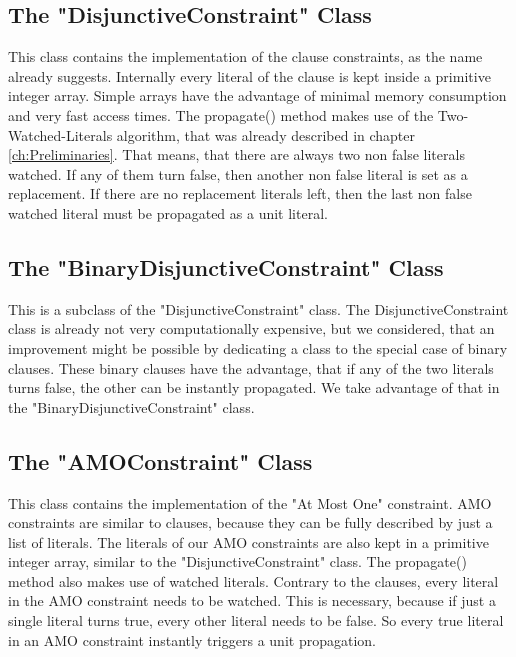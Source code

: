 \subsection{The "DisjunctiveConstraint" Class}

This class contains the implementation of the clause constraints, as the name already suggests. Internally every literal of the clause is kept inside a primitive integer array. Simple arrays have the advantage of minimal memory consumption and very fast access times. The propagate() method makes use of the Two-Watched-Literals algorithm, that was already described in chapter \ref{ch:Preliminaries}. That means, that there are always two non false literals watched. If any of them turn false, then another non false literal is set as a replacement. If there are no replacement literals left, then the last non false watched literal must be propagated as a unit literal.

\subsection{The "BinaryDisjunctiveConstraint" Class}

This is a subclass of the "DisjunctiveConstraint" class. The DisjunctiveConstraint class is already not very computationally expensive, but we considered, that an improvement might be possible by dedicating a class to the special case of binary clauses. These binary clauses have the advantage, that if any of the two literals turns false, the other can be instantly propagated. We take advantage of that in the "BinaryDisjunctiveConstraint" class.

\subsection{The "AMOConstraint" Class}

This class contains the implementation of the "At Most One" constraint. AMO constraints are similar to clauses, because they can be fully described by just a list of literals.
The literals of our AMO constraints are also kept in a primitive integer array, similar to the "DisjunctiveConstraint" class. The propagate() method also makes use of watched literals. Contrary to the clauses, every literal in the AMO constraint needs to be watched. This is necessary, because if just a single literal turns true, every other literal needs to be false. So every true literal in an AMO constraint instantly triggers a unit propagation.

